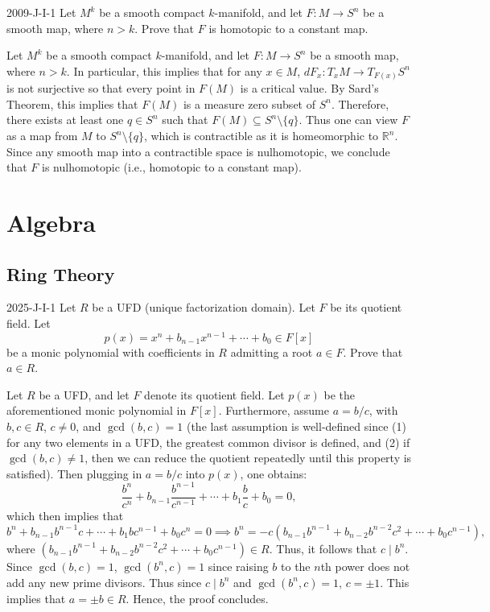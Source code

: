 \documentclass{article}
\begin{document}
	\begin{prb}{2009-J-I-1}
		Let $M^{k}$ be a smooth compact $k$-manifold, and let $F: M \to S^{n}$ be a smooth map, where $n > k$. Prove that $F$ is homotopic to a constant map. 
	\end{prb}
	Let $M^{k}$ be a smooth compact $k$-manifold, and let $F: M \to S^{n}$ be a smooth map, where $n > k$. In particular, this implies that for any $x \in M$, $dF_{x}: T_{x}M \to T_{F(x)}S^{n}$ is not surjective so that every point in $F(M)$ is a critical value. By Sard's Theorem, this implies that $F(M)$ is a measure zero subset of $S^{n}$. Therefore, there exists at least one $q \in S^{n}$ such that $F(M) \subseteq S^{n}\setminus \{q\}$. Thus one can view $F$ as a map from $M$ to $S^{n}\setminus \{q\}$, which is contractible as it is homeomorphic to $\mathbb{R}^{n}$. Since any smooth map into a contractible space is nulhomotopic, we conclude that $F$ is nulhomotopic (i.e., homotopic to a constant map). 	
	\newpage
	\section{Algebra}
	
	\subsection{Ring Theory}
	
	\begin{prb}{2025-J-I-1}
		Let $R$ be a UFD (unique factorization domain). Let $F$ be its quotient field. Let 
		\begin{equation*}
			p(x) = x^{n} + b_{n-1}x^{n - 1} + \dotsm + b_{0} \in F[x]
		\end{equation*}
		be a monic polynomial with coefficients in $R$ admitting a root $a \in F$. Prove that $a \in R$. 
	\end{prb}
	Let $R$ be a UFD, and let $F$ denote its quotient field. Let $p(x)$ be the aforementioned monic polynomial in $F[x]$. Furthermore, assume $a = b/c$, with $b, c \in R$, $c \neq 0$, and $\gcd(b, c) = 1$ (the last assumption is well-defined since (1) for any two elements in a UFD, the greatest common divisor is defined, and (2) if $\gcd(b, c) \neq 1$, then we can reduce the quotient repeatedly until this property is satisfied). Then plugging in $a = b/c$ into $p(x)$, one obtains: 
	\begin{equation*}
		\frac{b^{n}}{c^{n}} + b_{n-1}\frac{b^{n-1}}{c^{n-1}} + \dotsm + b_{1}\frac{b}{c} + b_{0} = 0, 
	\end{equation*}
	which then implies that 
	\begin{equation*}
		b^{n} + b_{n-1}b^{n-1}c + \dotsm + b_{1}bc^{n-1} + b_{0}c^{n} = 0 \implies b^{n} = -c(b_{n-1}b^{n-1} + b_{n-2}b^{n-2}c^{2} + \dotsm + b_{0}c^{n-1}),
	\end{equation*}
	where $(b_{n-1}b^{n-1} + b_{n-2}b^{n-2}c^{2} + \dotsm + b_{0}c^{n-1}) \in R$. Thus, it follows that $c \mid b^{n}$. Since $\gcd(b, c) = 1$, $\gcd(b^{n}, c) = 1$ since raising $b$ to the $n$th power does not add any new prime divisors. Thus since $c \mid b^{n}$ and $\gcd(b^{n}, c) = 1$, $c = \pm 1$. This implies that $a = \pm b \in R$. Hence, the proof concludes. 
	
\end{document}
